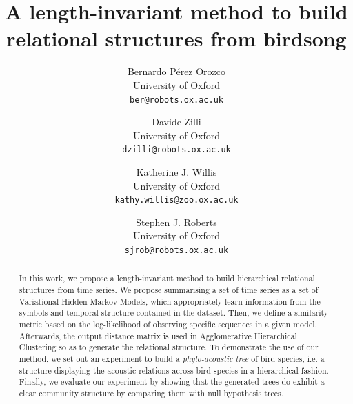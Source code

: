 \documentclass[pdftex,11pt,a4paper]{article}
\theoremstyle{definition}
\theoremstyle{remark}
\begin{document}
\title{A length-invariant method to build relational structures from birdsong}
\author{Bernardo P\'erez Orozco\\University of Oxford\\\texttt{ber@robots.ox.ac.uk} \and Davide Zilli \\University of Oxford\\\texttt{dzilli@robots.ox.ac.uk} \and Katherine J. Willis \\ University of Oxford \\ \texttt{kathy.willis@zoo.ox.ac.uk} \and Stephen J. Roberts\\University of Oxford\\\texttt{sjrob@robots.ox.ac.uk}}

\maketitle


\begin{abstract}
In this work, we propose a length-invariant method to build hierarchical relational structures from time series. We propose summarising a set of time series as a set of Variational Hidden Markov Models, which appropriately learn information from the symbols and temporal structure contained in the dataset. Then, we define a similarity metric based on the log-likelihood of observing specific sequences in a given model. Afterwards, the output distance matrix is used in Agglomerative Hierarchical Clustering so as to generate the relational structure. To demonstrate the use of our method, we set out an experiment to build a \textit{phylo-acoustic tree} of bird species, i.e. a structure displaying the acoustic relations across bird species in a hierarchical fashion. Finally, we evaluate our experiment by showing that the generated trees do exhibit a clear community structure by comparing them with null hypothesis trees.
\end{abstract}
\end{document}
